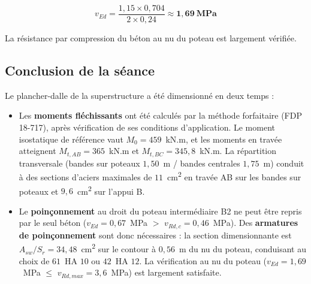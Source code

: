 \[
v_{Ed} = \frac{1{,}15 \times 0{,}704}{2 \times 0{,}24} \approx \mathbf{1{,}69~\text{MPa}}
\]


La résistance par compression du béton au nu du poteau est largement vérifiée.

\subsection{Conclusion de la séance}

Le plancher-dalle de la superstructure a été dimensionné en deux temps :

\begin{itemize}
  \item Les \textbf{moments fléchissants} ont été calculés par la méthode forfaitaire (FDP 18-717), après vérification de ses conditions d'application. Le moment isostatique de référence vaut $M_0 = 459$~kN.m, et les moments en travée atteignent $M_{t,AB} = 365$~kN.m et $M_{t,BC} = 345{,}8$~kN.m. La répartition transversale (bandes sur poteaux $1{,}50$~m / bandes centrales $1{,}75$~m) conduit à des sections d'aciers maximales de $11$~cm\textsuperscript{2} en travée AB sur les bandes sur poteaux et $9{,}6$~cm\textsuperscript{2} sur l'appui B.
  \item Le \textbf{poinçonnement} au droit du poteau intermédiaire B2 ne peut être repris par le seul béton ($v_{Ed} = 0{,}67$~MPa $>$ $v_{Rd,c} = 0{,}46$~MPa). Des \textbf{armatures de poinçonnement} sont donc nécessaires : la section dimensionnante est $A_{sw}/S_r = 34{,}48$~cm\textsuperscript{2} sur le contour à $0{,}56$~m du nu du poteau, conduisant au choix de $61$~HA $10$ ou $42$~HA $12$. La vérification au nu du poteau ($v_{Ed} = 1{,}69$~MPa $\leq$ $v_{Rd,max} = 3{,}6$~MPa) est largement satisfaite.
\end{itemize}

